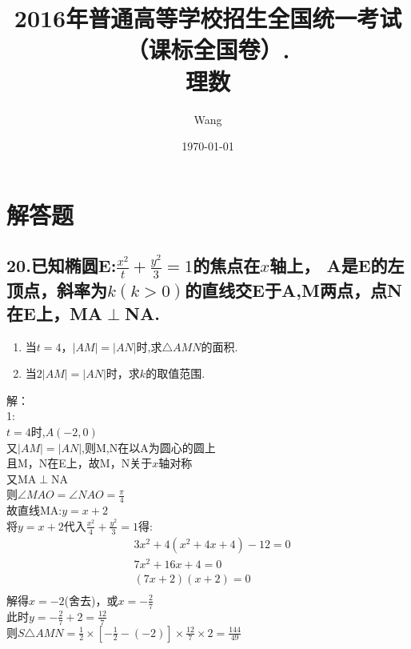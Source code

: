 \documentclass[UTF8]{ctexart}
\begin{document}
\title{2016年普通高等学校招生全国统一考试
    （课标全国卷\uppercase\expandafter{}）.\\
    \textbf{理数}}
\author{Wang}
\date{\today}
\maketitle

\section{解答题}
\subsection{20.已知椭圆E:$\frac{x^2}{t}+\frac{y^2}{3}=1$的焦点在$x$轴上，
    A是E的左顶点，斜率为$k(k>0)$的直线交E于A,M两点，点N在E上，MA$\perp$NA.}
\begin{enumerate}
    \item 当$t=4$，$|AM|=|AN|$时,求$\triangle AMN$的面积.
    \item 当$2|AM|=|AN|$时，求$k$的取值范围.
\end{enumerate}
解：\\
1:\\
$t=4$时,$A(-2,0)$\\
又$|AM|=|AN|$,则M,N在以A为圆心的圆上\\
且M，N在E上，故M，N关于$x$轴对称\\
又MA$\perp$NA\\
则$\angle MAO= \angle NAO=\frac{\pi}{4} $\\
故直线MA:$y=x+2$\\
将$ y=x+2 $代入$\frac{x^2}{4}+\frac{y^2}{3}=1$得: \\
\[
    \begin{aligned}
         & 3x^2+4(x^2+4x+4)-12=0 \\
         & 7x^2+16x+4=0          \\
         & (7x+2)(x+2)=0         \\
    \end{aligned}
\]
解得$ x=-2$(舍去)，或$x=-\frac{2}{7}$\\
此时$y=-\frac{2}{7}+2=\frac{12}{7}$\\
则$S\triangle AMN=\frac{1}{2}\times [-\frac{1}{2}-(-2)]\times \frac{12}{7}\times 2=\frac{144}{49}$\\
\end{document}
